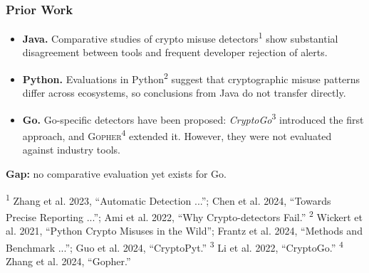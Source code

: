 \documentclass[10pt]{beamer}
\newcommand{\Gopher}{\textsc{Gopher}\xspace}
\begin{document}
\begin{frame}
    \frametitle{Prior Work}
    \begin{itemize}
        \setlength{\itemsep}{0.7em}
        \item \textbf{Java.} Comparative studies of crypto misuse detectors\textsuperscript{1} show substantial disagreement between tools and frequent developer rejection of alerts.
        \item \textbf{Python.} Evaluations in Python\textsuperscript{2} suggest that cryptographic misuse patterns differ across ecosystems, so conclusions from Java do not transfer directly.
        \item \textbf{Go.} Go-specific detectors have been proposed: \textit{CryptoGo}\textsuperscript{3} introduced the first approach, and \Gopher\textsuperscript{4} extended it. However, they were not evaluated against industry tools.
    \end{itemize}
    \vspace{0.8em}
    \textbf{Gap:} no comparative evaluation yet exists for Go.
    \vspace{1.8em}
    \vfill
    {\tiny\noindent
    \parbox{\textwidth}{%
    \textsuperscript{1} Zhang et al. 2023, ``Automatic Detection ...''; Chen et al. 2024, ``Towards Precise Reporting ...''; Ami et al. 2022, ``Why Crypto-detectors Fail.''\newline
    \textsuperscript{2} Wickert et al. 2021, ``Python Crypto Misuses in the Wild''; Frantz et al. 2024, ``Methods and Benchmark ...''; Guo et al. 2024, ``CryptoPyt.''\newline
    \textsuperscript{3} Li et al. 2022, ``CryptoGo.'' \textsuperscript{4} Zhang et al. 2024, ``Gopher.''
    }%
    }
\end{frame}


\end{document}
